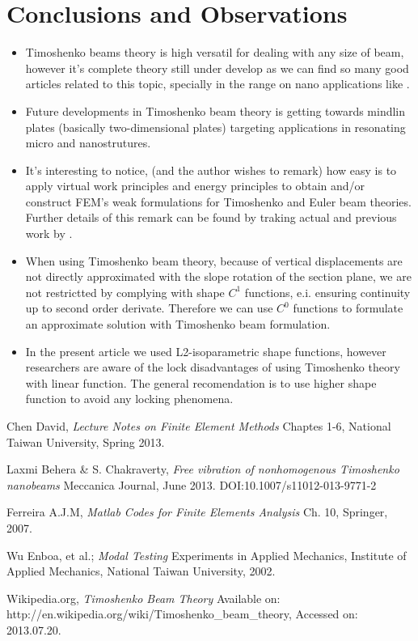 \documentclass[10pt,twoside,a4paper]{article}
\begin{document}
\section{Conclusions and Observations}
\begin{itemize}
 \item Timoshenko beams theory is high versatil for dealing with any size of beam, however it's complete theory still under develop as we can find so many good articles related to this topic, specially in the range on nano applications like \cite{Chakraverty2013}.
 \item Future developments in Timoshenko beam theory is getting towards mindlin plates (basically two-dimensional plates) targeting applications in resonating micro and nanostrutures.
 \item It's interesting to notice, (and the author wishes to remark) how easy is to apply virtual work principles and energy principles to obtain and/or construct FEM's weak formulations for Timoshenko and Euler beam theories. Further details of this remark can be found by traking actual and previous work by \cite{ferreira2007}.
 \item When using Timoshenko beam theory, because of vertical displacements are not directly approximated with the slope rotation of the section plane, we are not restrictted by complying with shape $C^1$ functions, e.i. ensuring continuity up to second order derivate. Therefore we can use $C^0$ functions to formulate an approximate solution with Timoshenko beam formulation.
 \item In the present article we used L2-isoparametric shape functions, however researchers are aware of the lock disadvantages of using Timoshenko theory with linear function. The general recomendation is to use higher shape function to avoid any locking phenomena.  
\end{itemize}

\begin{thebibliography}{9}

	Chen David, 
	\emph{Lecture Notes on Finite Element Methods}
	Chaptes 1-6,
	National Taiwan University,
	Spring 2013.

	Laxmi Behera \& S. Chakraverty,
	\emph{Free vibration of nonhomogenous Timoshenko nanobeams}
	Meccanica Journal,
	June 2013.
	DOI:10.1007/s11012-013-9771-2

	Ferreira A.J.M,
	\emph{Matlab Codes for Finite Elements Analysis}
	Ch. 10,
	Springer,
	2007.

	Wu Enboa, et al.;
	\emph{Modal Testing}
	Experiments in Applied Mechanics,
	Institute of Applied Mechanics,
	National Taiwan University,
	2002.

	Wikipedia.org,
	\emph{Timoshenko Beam Theory}
	Available on: http://en.wikipedia.org/wiki/Timoshenko\_beam\_theory,
	Accessed on: 2013.07.20.

	
\end{thebibliography}

\end{document}
